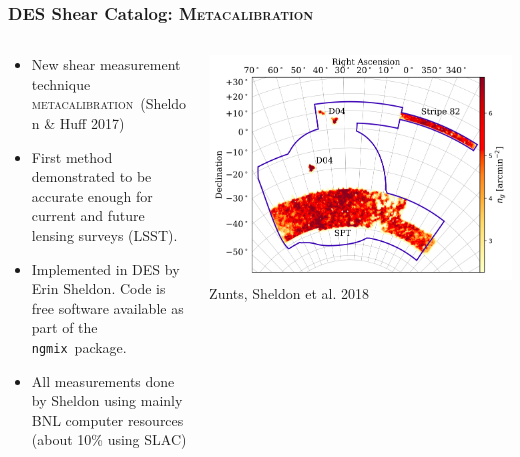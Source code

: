 \documentclass[aspectratio=169]{beamer}
\newcommand{\mcal}{\textsc{metacalibration}}
\newcommand{\Mcal}{\textsc{Metacalibration}}
\newcommand{\ngmix}{\texttt{ngmix}}
\begin{document}
\frame
{

    \frametitle{DES Shear Catalog: \Mcal}


    \begin{columns}
        \begin{column}{0.5\textwidth}
            \begin{itemize}

                \item New shear measurement technique \mcal\ (Sheldon \& Huff
                    2017)

                \item First method demonstrated to be accurate enough for
                    current and future lensing surveys (LSST).

                \item Implemented in DES by Erin Sheldon.  Code 
                    is free software available as part of the \ngmix\ package.

                \item All measurements done by Sheldon using mainly BNL computer
                    resources (about 10\% using SLAC)

            \end{itemize}

        \end{column}
        \begin{column}{0.5\textwidth}
            \centering
                \includegraphics[width=\linewidth]{shearcat-fig2.png}
                \newline
                {\tiny Zunts, Sheldon et al. 2018}
        \end{column}

    \end{columns}

}
\end{document}
